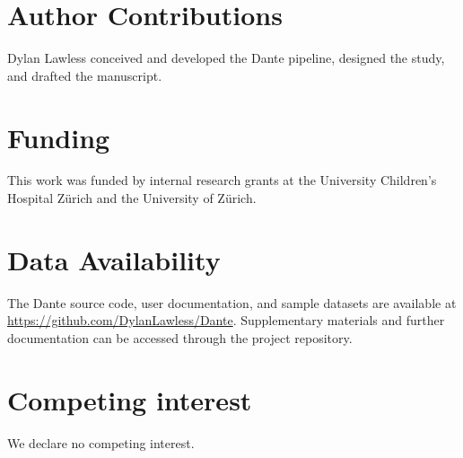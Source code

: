 \section*{Author Contributions}
\noindent
Dylan Lawless conceived and developed the Dante pipeline, designed the study, and drafted the manuscript.

\section*{Funding}
\noindent
This work was funded by internal research grants at the University Children's Hospital Zürich and the University of Zürich.

\section*{Data Availability}
\noindent
The Dante source code, user documentation, and sample datasets are available at \url{https://github.com/DylanLawless/Dante}. Supplementary materials and further documentation can be accessed through the project repository.

\section*{Competing interest}
\noindent
We declare no competing interest. 

\clearpage



